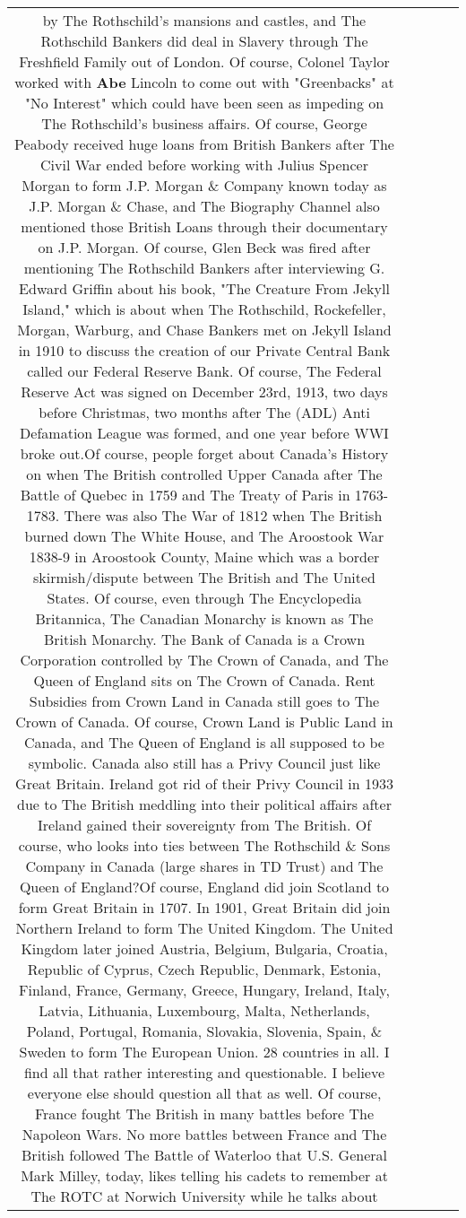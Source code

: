 \documentclass[11pt]{article}
\newlength\mylength
\begin{document}
\begin{center}
\begin{longtable}{|C{.65\mylength}|C{.30\mylength}|C{.12\mylength}|C{.12\mylength}|C{.12\mylength}|}
by The Rothschild's mansions and castles, and The Rothschild Bankers did deal in Slavery through The Freshfield Family out of London. Of course, Colonel Taylor worked with \textbf{Abe} Lincoln to come out with "Greenbacks" at "No Interest" which could have been seen as impeding on The Rothschild's business affairs. Of course, George Peabody received huge loans from British Bankers after The Civil War ended before working with Julius Spencer Morgan to form J.P. Morgan \& Company known today as J.P. Morgan \& Chase, and The Biography Channel also mentioned those British Loans through their documentary on J.P. Morgan. Of course, Glen Beck was fired after mentioning The Rothschild Bankers after interviewing G. Edward Griffin about his book, "The Creature From Jekyll Island," which is about when The Rothschild, Rockefeller, Morgan, Warburg, and Chase Bankers met on Jekyll Island in 1910 to discuss the creation of our Private Central Bank called our Federal Reserve Bank. Of course, The Federal Reserve Act was signed on December 23rd, 1913, two days before Christmas, two months after The (ADL) Anti Defamation League was formed, and one year before WWI broke out.Of course, people forget about Canada's History on when The British controlled Upper Canada after The Battle of Quebec in 1759 and The Treaty of Paris in 1763-1783. There was also The War of 1812 when The British burned down The White House, and The Aroostook War 1838-9 in Aroostook County, Maine which was a border skirmish/dispute between The British and The United States. Of course, even through The Encyclopedia Britannica, The Canadian Monarchy is known as The British Monarchy. The Bank of Canada is a Crown Corporation controlled by The Crown of Canada, and The Queen of England sits on The Crown of Canada. Rent Subsidies from Crown Land in Canada still goes to The Crown of Canada. Of course, Crown Land is Public Land in Canada, and The Queen of England is all supposed to be symbolic. Canada also still has a Privy Council just like Great Britain. Ireland got rid of their Privy Council in 1933 due to The British meddling into their political affairs after Ireland gained their sovereignty from The British. Of course, who looks into ties between The Rothschild \& Sons Company in Canada (large shares in TD Trust) and The Queen of England?Of course, England did join Scotland to form Great Britain in 1707. In 1901, Great Britain did join Northern Ireland to form The United Kingdom. The United Kingdom later joined Austria, Belgium, Bulgaria, Croatia, Republic of Cyprus, Czech Republic, Denmark, Estonia, Finland, France, Germany, Greece, Hungary, Ireland, Italy, Latvia, Lithuania, Luxembourg, Malta, Netherlands, Poland, Portugal, Romania, Slovakia, Slovenia, Spain, \& Sweden to form The European Union. 28 countries in all. I find all that rather interesting and questionable. I believe everyone else should question all that as well. Of course, France fought The British in many battles before The Napoleon Wars. No more battles between France and The British followed The Battle of Waterloo that U.S. General Mark Milley, today, likes telling his cadets to remember at The ROTC at Norwich University while he talks about 
\end{longtable}
\end{center}
\end{document}

